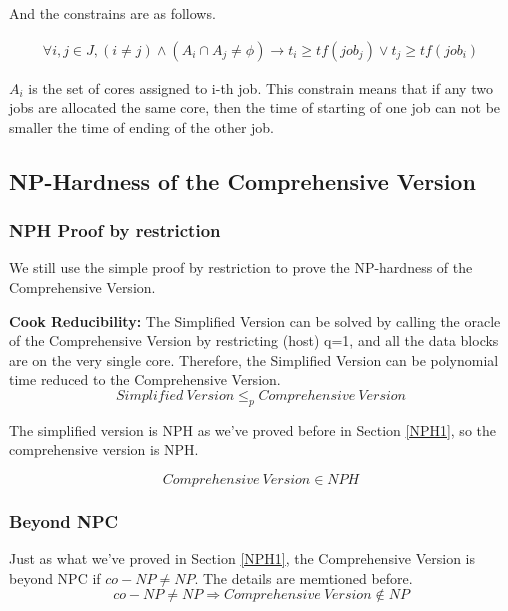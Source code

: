\documentclass{article}
\begin{document}
        And the constrains are as follows.
        \vspace{-5mm}
        \begin{center}
        $$
        \begin{aligned}
            \forall i, j \in J,
            (i \neq j) \wedge\left(A_{i} \cap A_{j} \neq \phi\right)
            \rightarrow 
            t_{i} \geqslant t f\left(job_{j}\right) \vee t_{j} \geqslant t f\left(job_{i}\right)
        \end{aligned}
        $$
        \end{center}
        
        $A_i$ is the set of cores assigned to i-th job. This constrain means that if any two jobs are allocated the same core, then the time of starting of one job can not be smaller the time of ending of the other job.
    

    
\subsection{NP-Hardness of the Comprehensive Version}
\subsubsection{NPH Proof by restriction}
We still use the simple proof by restriction to prove the NP-hardness of the Comprehensive Version.

\textbf{Cook Reducibility:} The Simplified Version can be solved by calling the oracle of the Comprehensive Version by restricting (host) q=1, and all the data blocks are on the very single core. Therefore, the Simplified Version can be polynomial time reduced to the Comprehensive Version. 
\begin{equation}
    Simplified\ Version\leq_p Comprehensive\ Version
\end{equation}

The simplified version is NPH as we've proved before in Section \ref{NPH1}, so the comprehensive version is NPH.

\begin{equation}
    Comprehensive\ Version \in NPH
\end{equation}

\subsubsection{Beyond NPC}
Just as what we've proved in Section \ref{NPH1}, the Comprehensive Version is beyond NPC if $co-NP \neq NP$. The details are memtioned before.
\begin{equation}
    co-NP \neq NP \Longrightarrow Comprehensive\ Version \notin NP
\end{equation}
\end{document}
